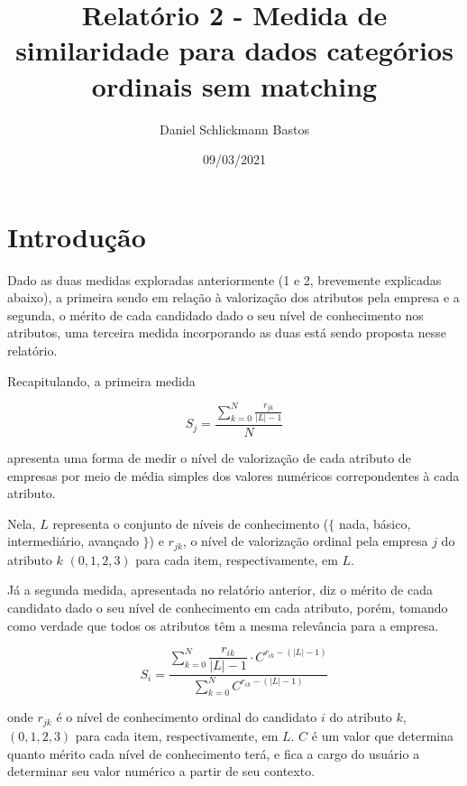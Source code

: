 \documentclass[]{article}
\title{Relatório 2 - Medida de similaridade para dados categórios ordinais sem matching}
\author[1]{Daniel Schlickmann Bastos}
\date{09/03/2021}
\begin{document}
	\maketitle
	
	\section{Introdução}
	
	Dado as duas medidas exploradas anteriormente (1 e 2, brevemente explicadas abaixo), a primeira sendo em relação à valorização dos atributos pela empresa e a segunda, o mérito de cada candidado dado o seu nível de conhecimento nos atributos, uma terceira medida incorporando as duas está sendo proposta nesse relatório.
	
	Recapitulando, a primeira medida
	
	\begin{center}
		\begin{equation}
			S_j = \dfrac{\sum_{k = 0}^N \frac{r_{jk}}{|L| - 1}}{N}
		\end{equation}	
	\end{center}
	
	apresenta uma forma de medir o nível de valorização de cada atributo de empresas por meio de média simples dos valores numéricos correpondentes à cada atributo.
	
	Nela, $L$ representa o conjunto de níveis de conhecimento ($\{$ nada, básico, intermediário, avançado $\}$) e $r_{jk}$, o nível de valorização ordinal pela empresa $j$ do atributo $k$ $(0, 1, 2, 3)$ para cada item, respectivamente, em $L$.
	
	Já a segunda medida, apresentada no relatório anterior, diz o mérito de cada candidato dado o seu nível de conhecimento em cada atributo, porém, tomando como verdade que todos os atributos têm a mesma relevância para a empresa. 
	
	\begin{center}
		\begin{equation}
			S_i = \dfrac{\sum_{k = 0}^N \dfrac{r_{ik}}{|L| - 1} \cdot C^{r_{ik} - (|L| - 1)}}{\sum_{k = 0}^N C^{r_{ik} - (|L| - 1)}}
		\end{equation}		
	\end{center}
	
	onde $r_{jk}$ é o nível de conhecimento ordinal do candidato $i$ do atributo $k$, $(0, 1, 2, 3)$ para cada item, respectivamente, em $L$. $ C $ é um valor que determina quanto mérito cada nível de conhecimento terá, e fica a cargo do usuário a determinar seu valor numérico a partir de seu contexto.
	
\end{document}
